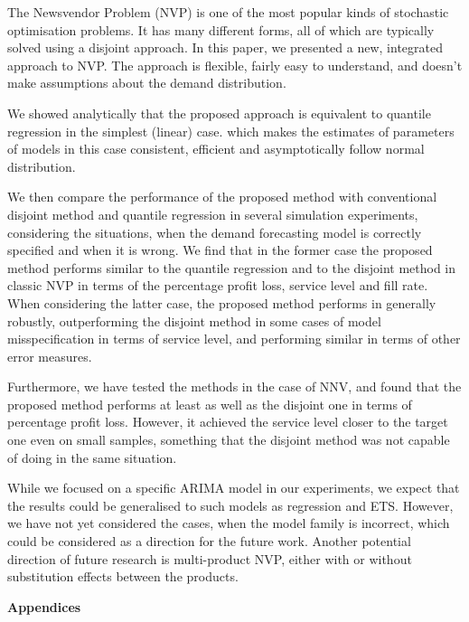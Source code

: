 \documentclass{article}
\begin{document}
The Newsvendor Problem (NVP) is one of the most popular kinds of stochastic optimisation problems. It has many different forms, all of which are typically solved using a disjoint approach. In this paper, we presented a new, integrated approach to NVP. The approach is flexible, fairly easy to understand, and doesn't make assumptions about the demand distribution.

We showed analytically that the proposed approach is equivalent to quantile regression in the simplest (linear) case.  which makes the estimates of parameters of models in this case consistent, efficient and asymptotically follow normal distribution.

We then compare the performance of the proposed method with conventional disjoint method and quantile regression in several simulation experiments, considering the situations, when the demand forecasting model is correctly specified and when it is wrong. We find that in the former case the proposed method performs similar to the quantile regression and to the disjoint method in classic NVP in terms of the percentage profit loss, service level and fill rate. When considering the latter case, the proposed method performs in generally robustly, outperforming the disjoint method in some cases of model misspecification in terms of service level, and performing similar in terms of other error measures.

Furthermore, we have tested the methods in the case of NNV, and found that the proposed method performs at least as well as the disjoint one in terms of percentage profit loss. However, it achieved the service level closer to the target one even on small samples, something that the disjoint method was not capable of doing in the same situation.

While we focused on a specific ARIMA model in our experiments, we expect that the results could be generalised to such models as regression and ETS. However, we have not yet considered the cases, when the model family is incorrect, which could be considered as a direction for the future work. Another potential direction of future research is multi-product NVP, either with or without substitution effects between the products.

\printbibliography

\newpage
\begin{center}
{\bf\Large Appendices}
\end{center}
\end{document}

